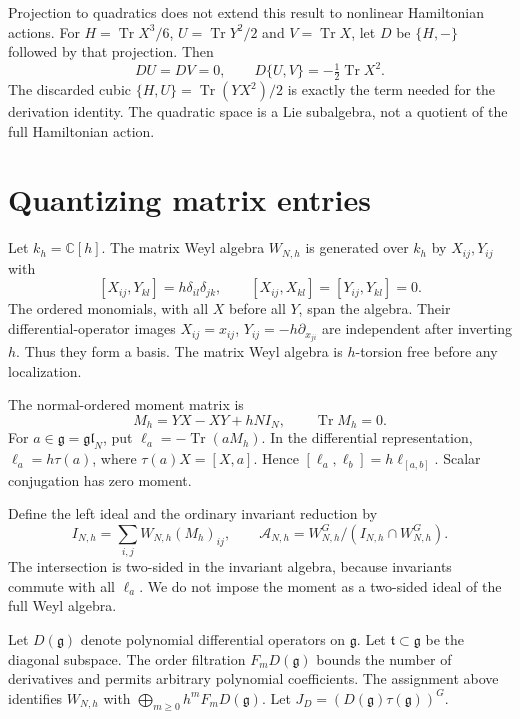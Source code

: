 Projection to quadratics does not extend this result to nonlinear
Hamiltonian actions. For
$H=\operatorname{Tr}X^3/6$, $U=\operatorname{Tr}Y^2/2$ and
$V=\operatorname{Tr}X$, let $D$ be $\{H,-\}$ followed by that
projection. Then
\[
 DU=DV=0,\qquad D\{U,V\}=-\tfrac12\operatorname{Tr}X^2.
\]
The discarded cubic $\{H,U\}=\operatorname{Tr}(YX^2)/2$
is exactly the term needed for the derivation identity.
The quadratic space is a Lie subalgebra, not a quotient of the
full Hamiltonian action.

\section{Quantizing matrix entries}

Let $k_h=\mathbb C[h]$. The matrix Weyl algebra $W_{N,h}$ is
generated over $k_h$ by $X_{ij},Y_{ij}$ with
\begin{equation}\label{mht:eq:entrywise-weyl}
 [X_{ij},Y_{kl}]=h\delta_{il}\delta_{jk},\qquad
 [X_{ij},X_{kl}]=[Y_{ij},Y_{kl}]=0.
\end{equation}
The ordered monomials, with all $X$ before all $Y$, span the algebra.
Their differential-operator images
$X_{ij}=x_{ij}$, $Y_{ij}=-h\partial_{x_{ji}}$ are independent
after inverting $h$. Thus they form a basis.
The matrix Weyl algebra is $h$-torsion
free before any localization.

The normal-ordered moment matrix is
\begin{equation}\label{mht:eq:normal-moment}
 M_h=YX-XY+hNI_N,\qquad \operatorname{Tr}M_h=0.
\end{equation}
For $a\in\mathfrak g=\mathfrak{gl}_N$, put
$\ell_a=-\operatorname{Tr}(aM_h)$. In the differential
representation, $\ell_a=h\tau(a)$, where
$\tau(a)X=[X,a]$. Hence
$[\ell_a,\ell_b]=h\ell_{[a,b]}$.
Scalar conjugation has zero moment.

Define the left ideal and the ordinary invariant reduction by
\[
 I_{N,h}=\sum_{i,j}W_{N,h}(M_h)_{ij},\qquad
 \mathcal A_{N,h}=W_{N,h}^G/(I_{N,h}\cap W_{N,h}^G).
\]
The intersection is two-sided in the invariant algebra, because
invariants commute with all $\ell_a$. We do not impose the moment
as a two-sided ideal of the full Weyl algebra.

Let $D(\mathfrak g)$ denote polynomial differential operators
on $\mathfrak g$. Let $\mathfrak t\subset\mathfrak g$ be the
diagonal subspace.
The order filtration $F_mD(\mathfrak g)$ bounds the number of
derivatives and permits arbitrary polynomial coefficients.
The assignment above identifies $W_{N,h}$ with
$\bigoplus_{m\geq0}h^mF_mD(\mathfrak g)$.
Let $J_D=(D(\mathfrak g)\tau(\mathfrak g))^G$.

